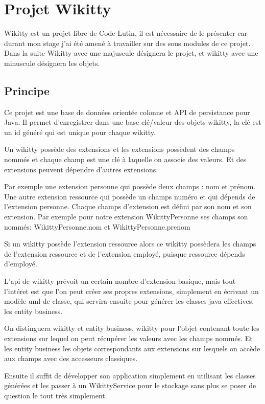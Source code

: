 \section{Projet Wikitty}

Wikitty est un projet libre de Code Lutin, il est nécessaire de le présenter car
durant mon stage j'ai été amené à travailler sur des sous modules de ce projet.
Dans la suite Wikitty avec une majuscule désignera le projet, et wikitty avec
une minuscule désignera les objets.

\subsection{Principe}

Ce projet est une base de données orientée colonne et API de persistance pour
Java. Il permet d'enregistrer dans une base clé/valeur des objets wikitty, la
clé est un id généré qui est unique pour chaque wikitty. 

Un wikitty possède des extensions et les extensions possèdent des champs nommés
et chaque champ est une clé à laquelle on associe des valeurs. Et des extensions
peuvent dépendre d'autres extensions.

Par exemple une extension personne qui possède deux champs : nom et prénom.
Une autre extension ressource qui possède un champs numéro et qui dépends de
l'extension personne. Chaque champs d'extension est défini par son nom et son 
extension. Par exemple pour notre extension WikittyPersonne ses champs son nommés:
WikittyPersonne.nom et WikittyPersonne.prenom

Si un wikitty possède l'extension ressource alors ce wikitty possèdera les
champs de l'extension ressource et de l'extension employé, puisque ressource
dépends d'employé.

L'api de wikitty prévoit un certain nombre d'extension basique, mais tout
l'intéret est que l'on peut créer ses propres extensions, simplement en écrivant
un modèle uml de classe, qui servira ensuite pour générer les classes java
effectives, les entity business.

On distinguera wikitty et entity business, wikitty pour l'objet contenant toute
les extensions sur lequel on peut récupérer les valeurs avec les champs nommés.
Et les entity business les objets correspondants aux extensions sur lesquels 
on accède aux champs avec des accesseurs classiques.

Ensuite il suffit de développer son application simplement en utilisant les
classes générées et les passer à un WikittyService pour le stockage sans plus
se poser de question le tout très simplement.

